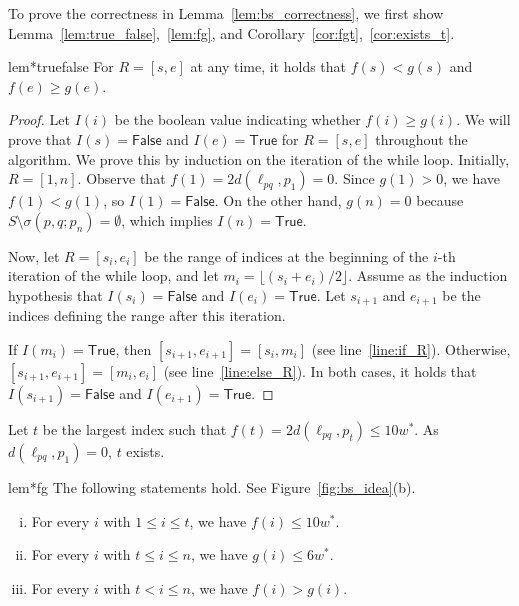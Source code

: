 \documentclass[english,a4paper, cleveref, autoref, thm-restate, nolineno]{socg-lipics-v2021}
\theoremstyle{star}
\theoremstyle{claimstar}
\newcommand{\true}{\textsf{True}\xspace}
\newcommand{\false}{\textsf{False}\xspace}
\begin{document}
To prove the correctness in Lemma~\ref{lem:bs_correctness}, we first show Lemma~\ref{lem:true_false},~\ref{lem:fg}, and Corollary~\ref{cor:fgt},~\ref{cor:exists_t}.






\begin{restatable}{lem*}{truefalse}
    \label{lem:true_false}
    For $R = [s, e]$ at any time, it holds that $f(s)< g(s)$ and $f(e) \ge g(e)$.
\end{restatable}


\begin{proof}
    Let $I(i)$ be the boolean value indicating whether $f(i) \ge g(i)$.
    We will prove that $I(s) = \false$ and $I(e) = \true$ for $R = [s, e]$ throughout the algorithm.
    We prove this by induction on the iteration of the while loop.
    Initially, $R = [1, n]$.
    Observe that $f(1) = 2d(\ell_{pq}, p_1) = 0$.
    Since $g(1) > 0$, we have $f(1) < g(1)$, so $I(1) = \false$.
    On the other hand, $g(n) = 0$ because $S \setminus \sigma(p, q; p_n) = \emptyset$, which implies $I(n) = \true$.
    
    Now, let $R = [s_i, e_i]$ be the range of indices at the beginning of the $i$-th iteration of the while loop, and let $m_i = \lfloor (s_i + e_i)/2 \rfloor$.
    Assume as the induction hypothesis that $I(s_i) = \false$ and $I(e_i) = \true$.
    Let $s_{i+1}$ and $e_{i+1}$ be the indices defining the range after this iteration.
    
    If $I(m_i) = \true$, then $[s_{i+1}, e_{i+1}] = [s_i, m_i]$ (see line~\ref{line:if_R}).
    Otherwise, $[s_{i+1}, e_{i+1}] = [m_i, e_i]$ (see line~\ref{line:else_R}).
    In both cases, it holds that $I(s_{i+1}) = \false$ and $I(e_{i+1}) = \true$.
\end{proof}


Let $t$ be the largest index such that $f(t) = 2d(\ell_{pq}, p_t) \le 10w^*$.
As $d(\ell_{pq}, p_1) = 0$, $t$ exists.

\begin{restatable}{lem*}{fg}
    \label{lem:fg}
    The following statements hold. See Figure~\ref{fig:bs_idea}(b).
    \begin{enumerate}[(i)]
        \item For every $i$ with $1\le i \le t$, we have $f(i) \le 10w^*$. 
        \item For every $i$ with $t\le i \le n$, 
    we have $g(i) \le 6w^*$. 
        \item For every $i$ with $t < i \le n$, we have $f(i) > g(i)$. 
    \end{enumerate}
\end{restatable}
\end{document}
